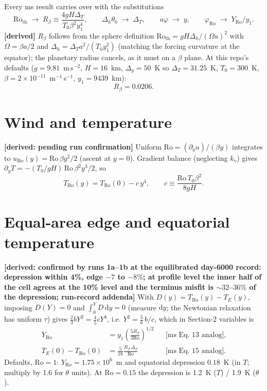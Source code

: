 \documentclass[11pt]{article}
\newcommand{\Ro}{\mathrm{Ro}}
\newcommand{\Rb}{R_\beta}
\begin{document}
Every ms result carries over with the substitutions
\begin{equation}
  \Ro_{\mathrm{th}} \;\to\; \Rb \equiv \frac{4 g H \Delta_T}{T_0 \beta^2 y_1^4},
  \qquad
  \Delta_h \theta_0 \;\to\; \Delta_T,
  \qquad
  a\varphi \;\to\; y,
  \qquad
  \varphi_{\Ro} \;\to\; Y_{\Ro}/y_1.
\end{equation}
\textbf{[derived]} $\Rb$ follows from the sphere definition
$\Ro_{\mathrm{th}} = g H \Delta_h / (\Omega a)^2$ with $\Omega = \beta a/2$
and $\Delta_h = \Delta_T a^2 / (T_0 y_1^2)$ (matching the forcing curvature
at the equator); the planetary radius cancels, as it must on a $\beta$
plane. At this repo's defaults ($g = 9.81$~m\,s$^{-2}$, $H = 16$~km,
$\Delta_y = 50$~K so $\Delta_T = 31.25$~K, $T_0 = 300$~K,
$\beta = 2\times 10^{-11}$~m$^{-1}$\,s$^{-1}$, $y_1 = 9439$~km):
\begin{equation}
  \boxed{\;\Rb = 0.0206.\;}
\end{equation}

\section{Wind and temperature}
\label{sec:wind}

\textbf{[derived: pending run confirmation]}
Uniform $\Ro = (\partial_y u)/(\beta y)$ integrates to
$u_{\Ro}(y) = \Ro\, \beta y^2/2$ (ascent at $y = 0$). Gradient balance
(neglecting $k_v$) gives $\partial_y T = -(T_0 / g H)\, \Ro\, \beta^2 y^3/2$,
so
\begin{equation}
  T_{\Ro}(y) = T_{\Ro}(0) - c\, y^4,
  \qquad c \equiv \frac{\Ro\, T_0 \beta^2}{8 g H}.
  \label{eq:TRo}
\end{equation}

\section{Equal-area edge and equatorial temperature}
\label{sec:edge}

\textbf{[derived: confirmed by runs 1a--1b at the equilibrated day-6000
record: depression within 4\%, edge $-7$ to $-8\%$; at profile level the
inner half of the cell agrees at the 10\% level and the terminus misfit
is ${\sim}32$--$36\%$ of the depression; run-record addenda]}
With $D(y) = T_{\Ro}(y) - T_E(y)$, imposing $D(Y) = 0$ and
$\int_0^Y D\, \mathrm{d}y = 0$ (measure $\mathrm{d}y$; the Newtonian
relaxation has uniform $\tau$) gives $\tfrac{2}{3} b Y^2 = \tfrac{4}{5} c
Y^4$, i.e. $Y^2 = \tfrac{5}{6}\, b/c$, which in Section-2 variables is
\begin{align}
  Y_{\Ro} &= y_1 \left( \frac{5 \Rb}{3 \Ro} \right)^{1/2}
  &&\text{[ms Eq.~13 analog]},
  \label{eq:Yro} \\
  T_E(0) - T_{\Ro}(0) &= \frac{5}{18} \frac{\Rb\, \Delta_T}{\Ro}
  &&\text{[ms Eq.~15 analog]}.
  \label{eq:depression}
\end{align}
Defaults, $\Ro = 1$: $Y_{\Ro} = 1.75\times 10^6$~m and equatorial
depression $0.18$~K (in $T$; multiply by 1.6 for $\theta$ units). At
$\Ro = 0.15$ the depression is 1.2~K ($T$) / 1.9~K ($\theta$).
\end{document}
